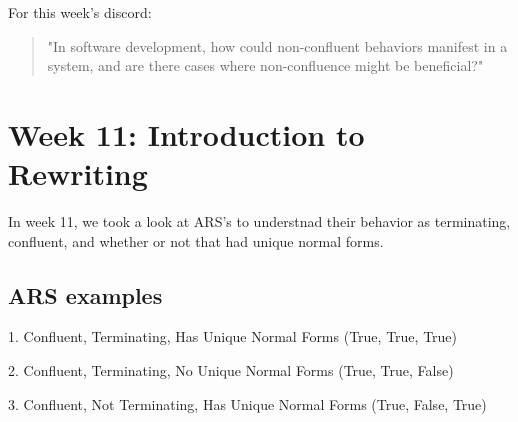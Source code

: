 \documentclass{article}
\begin{document}
For this week's discord:

\begin{quote}
\small
"In software development, how could non-confluent behaviors manifest in a system, and are there cases where non-confluence might be beneficial?"
\end{quote}

\section{Week 11: Introduction to Rewriting}
\label{sec:week11}

In week 11, we took a look at ARS's to understnad their behavior as terminating, confluent, and whether or not that had unique normal forms.  

\subsection*{ARS examples}

1. Confluent, Terminating, Has Unique Normal Forms (True, True, True)
    
    \vspace{1cm}
    
    2. Confluent, Terminating, No Unique Normal Forms (True, True, False)
    
    \vspace{1cm}
    
    3. Confluent, Not Terminating, Has Unique Normal Forms (True, False, True)
    
\end{document}
